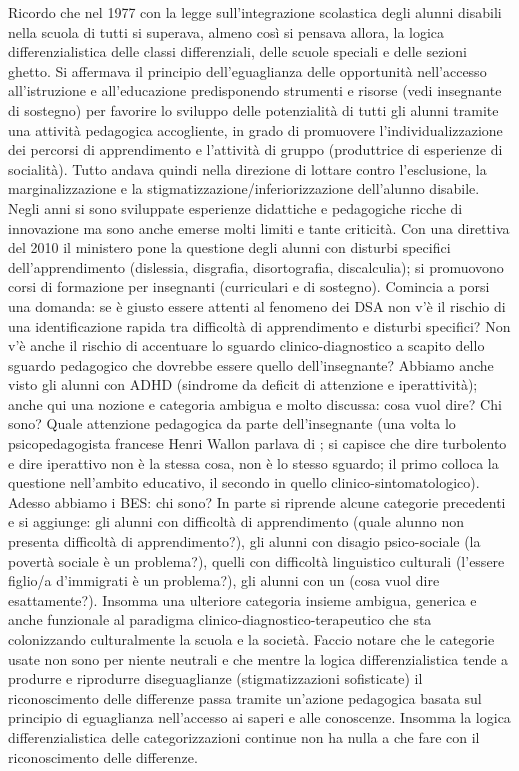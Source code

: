 Ricordo che nel 1977 con la legge sull'integrazione scolastica degli alunni disabili nella scuola di tutti si superava, almeno così si pensava allora, la logica differenzialistica delle classi differenziali, delle scuole speciali e delle sezioni ghetto. Si affermava il principio dell'eguaglianza delle opportunità nell'accesso all'istruzione e all'educazione predisponendo strumenti e risorse (vedi insegnante di sostegno) per favorire lo sviluppo delle potenzialità di tutti gli alunni tramite una attività pedagogica accogliente, in grado di promuovere l'individualizzazione dei percorsi di apprendimento e l'attività di gruppo (produttrice di esperienze di socialità). Tutto andava quindi nella direzione di lottare contro l'esclusione, la marginalizzazione e la stigmatizzazione/inferiorizzazione dell'alunno disabile. Negli anni si sono sviluppate esperienze didattiche e pedagogiche ricche di innovazione ma sono anche emerse molti limiti e tante criticità. Con una direttiva del 2010 il ministero pone la questione degli alunni con disturbi specifici dell'apprendimento (dislessia, disgrafia, disortografia, discalculia); si promuovono corsi di formazione per insegnanti (curriculari e di sostegno). Comincia a porsi una domanda: se è giusto essere attenti al fenomeno dei DSA non v'è il rischio di una identificazione rapida tra difficoltà di apprendimento e disturbi specifici? Non v'è anche il rischio di accentuare lo sguardo clinico-diagnostico a scapito dello sguardo pedagogico che dovrebbe essere quello dell'insegnante? Abbiamo anche visto gli alunni con ADHD (sindrome da deficit di attenzione e iperattività); anche qui una nozione e categoria ambigua e molto discussa: cosa vuol dire? Chi sono? Quale attenzione pedagogica da parte dell'insegnante (una volta lo psicopedagogista francese Henri Wallon parlava di ; si capisce che dire turbolento e dire iperattivo non è la stessa cosa, non è lo stesso sguardo; il primo colloca la questione nell’ambito educativo, il secondo in quello clinico-sintomatologico). Adesso abbiamo i BES: chi sono? In parte si riprende alcune categorie precedenti e si aggiunge: gli alunni con difficoltà di apprendimento (quale alunno non presenta difficoltà di apprendimento?), gli alunni con disagio psico-sociale (la povertà sociale è un problema?), quelli con difficoltà linguistico culturali (l'essere figlio/a d'immigrati è un problema?), gli alunni con un  (cosa vuol dire esattamente?). Insomma una ulteriore categoria insieme ambigua, generica e anche funzionale al paradigma clinico-diagnostico-terapeutico che sta colonizzando culturalmente la scuola e la società. Faccio notare che le categorie usate non sono per niente neutrali e che mentre la logica differenzialistica tende a produrre e riprodurre diseguaglianze (stigmatizzazioni sofisticate) il riconoscimento delle differenze passa tramite un'azione pedagogica basata sul principio di eguaglianza nell'accesso ai saperi e alle conoscenze. Insomma la logica differenzialistica delle categorizzazioni continue non ha nulla a che fare con il riconoscimento delle differenze.
